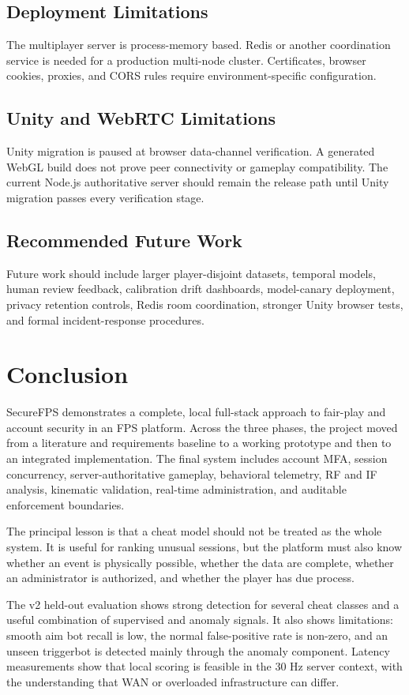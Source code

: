 \documentclass[12pt,a4paper,oneside]{report}
\begin{document}
\section{Deployment Limitations}
The multiplayer server is process-memory based. Redis or another coordination service is needed for a production multi-node cluster. Certificates, browser cookies, proxies, and CORS rules require environment-specific configuration.

\section{Unity and WebRTC Limitations}
Unity migration is paused at browser data-channel verification. A generated WebGL build does not prove peer connectivity or gameplay compatibility. The current Node.js authoritative server should remain the release path until Unity migration passes every verification stage.

\section{Recommended Future Work}
Future work should include larger player-disjoint datasets, temporal models, human review feedback, calibration drift dashboards, model-canary deployment, privacy retention controls, Redis room coordination, stronger Unity browser tests, and formal incident-response procedures.

\chapter{Conclusion}
SecureFPS demonstrates a complete, local full-stack approach to fair-play and account security in an FPS platform. Across the three phases, the project moved from a literature and requirements baseline to a working prototype and then to an integrated implementation. The final system includes account MFA, session concurrency, server-authoritative gameplay, behavioral telemetry, RF and IF analysis, kinematic validation, real-time administration, and auditable enforcement boundaries.

The principal lesson is that a cheat model should not be treated as the whole system. It is useful for ranking unusual sessions, but the platform must also know whether an event is physically possible, whether the data are complete, whether an administrator is authorized, and whether the player has due process.

The v2 held-out evaluation shows strong detection for several cheat classes and a useful combination of supervised and anomaly signals. It also shows limitations: smooth aim bot recall is low, the normal false-positive rate is non-zero, and an unseen triggerbot is detected mainly through the anomaly component. Latency measurements show that local scoring is feasible in the 30 Hz server context, with the understanding that WAN or overloaded infrastructure can differ.
\end{document}

